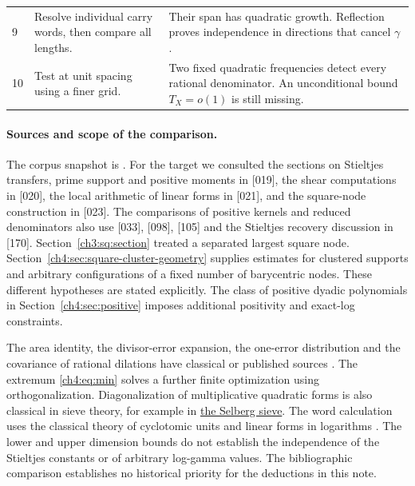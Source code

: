 \documentclass[11pt,a4paper,oneside,openany]{report}
\theoremstyle{remark}\newtheorem{remark}[theorem]{Remark}
\numberwithin{equation}{section}
\begin{document}
\begin{small}
\begin{tabular}{@{}l>{\raggedright\arraybackslash}p{.39\linewidth}>{\raggedright\arraybackslash}p{.48\linewidth}@{}}
9 & Resolve individual carry words, then compare all lengths. & Their span has quadratic growth. Reflection proves independence in directions that cancel $\gamma$.\\
10 & Test at unit spacing using a finer grid. & Two fixed quadratic frequencies detect every rational denominator. An unconditional bound $T_X=o(1)$ is still missing.\\
\bottomrule
\end{tabular}\par
\end{small}

\paragraph{Sources and scope of the comparison.}
The corpus snapshot is \cite{corpus}. For the target we consulted the sections on Stieltjes transfers, prime support and positive moments in [019], the shear computations in [020], the local arithmetic of linear forms in [021], and the square-node construction in [023]. The comparisons of positive kernels and reduced denominators also use [033], [098], [105] and the Stieltjes recovery discussion in [170]. Section~\ref{ch3:sq:section} treated a separated largest square node. Section~\ref{ch4:sec:square-cluster-geometry} supplies estimates for clustered supports and arbitrary configurations of a fixed number of barycentric nodes. These different hypotheses are stated explicitly. The class of positive dyadic polynomials in Section~\ref{ch4:sec:positive} imposes additional positivity and exact-log constraints.

The area identity, the divisor-error expansion, the one-error distribution and the covariance of rational dilations have classical or published sources \cite{lagarias,pill,hb,amrs}. The extremum \eqref{ch4:eq:min} solves a further finite optimization using orthogonalization. Diagonalization of multiplicative quadratic forms is also classical in sieve theory, for example in \href{https://kskedlaya.org/ant/chap-selberg.html}{the Selberg sieve}. The word calculation uses the classical theory of cyclotomic units and linear forms in logarithms \cite{cd}. The lower and upper dimension bounds do not establish the independence of the Stieltjes constants or of arbitrary log-gamma values. The bibliographic comparison establishes no historical priority for the deductions in this note.

\end{document}
